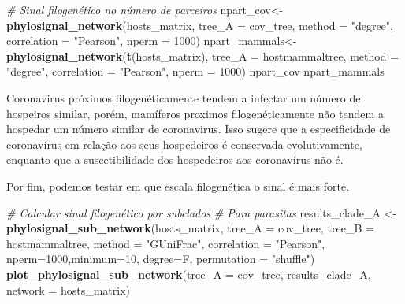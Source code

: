 \documentclass[
]{book}
\newenvironment{Shaded}{\begin{snugshade}}{\end{snugshade}}
\newcommand{\AttributeTok}[1]{\textcolor[rgb]{0.13,0.29,0.53}{#1}}
\newcommand{\CommentTok}[1]{\textcolor[rgb]{0.56,0.35,0.01}{\textit{#1}}}
\newcommand{\DecValTok}[1]{\textcolor[rgb]{0.00,0.00,0.81}{#1}}
\newcommand{\FunctionTok}[1]{\textcolor[rgb]{0.13,0.29,0.53}{\textbf{#1}}}
\newcommand{\NormalTok}[1]{#1}
\newcommand{\OtherTok}[1]{\textcolor[rgb]{0.56,0.35,0.01}{#1}}
\newcommand{\StringTok}[1]{\textcolor[rgb]{0.31,0.60,0.02}{#1}}
\begin{document}
\begin{Shaded}
\begin{Highlighting}[]
\CommentTok{\# Sinal filogenético no número de parceiros}
\NormalTok{npart\_cov}\OtherTok{\textless{}{-}}\FunctionTok{phylosignal\_network}\NormalTok{(hosts\_matrix, }
 \AttributeTok{tree\_A =}\NormalTok{ cov\_tree, }
 \AttributeTok{method =} \StringTok{"degree"}\NormalTok{, }
 \AttributeTok{correlation =} \StringTok{"Pearson"}\NormalTok{, }\AttributeTok{nperm =} \DecValTok{1000}\NormalTok{)}
\NormalTok{npart\_mammals}\OtherTok{\textless{}{-}}\FunctionTok{phylosignal\_network}\NormalTok{(}\FunctionTok{t}\NormalTok{(hosts\_matrix), }
 \AttributeTok{tree\_A =}\NormalTok{ hostmammaltree, }
 \AttributeTok{method =} \StringTok{"degree"}\NormalTok{, }
 \AttributeTok{correlation =} \StringTok{"Pearson"}\NormalTok{, }\AttributeTok{nperm =} \DecValTok{1000}\NormalTok{)}
\NormalTok{npart\_cov}
\NormalTok{npart\_mammals}
\end{Highlighting}
\end{Shaded}

Coronavirus próximos filogenéticamente tendem a infectar um número de hospeiros similar, porém, mamíferos proximos filogenéticamente não tendem a hospedar um número similar de coronavirus. Isso sugere que a especificidade de coronavírus em relação aos seus hospedeiros é conservada evolutivamente, enquanto que a suscetibilidade dos hospedeiros aos coronavírus não é.

Por fim, podemos testar em que escala filogenética o sinal é mais forte.

\begin{Shaded}
\begin{Highlighting}[]
\CommentTok{\# Calcular sinal filogenético por subclados}
\CommentTok{\# Para parasitas}
\NormalTok{results\_clade\_A }\OtherTok{\textless{}{-}} \FunctionTok{phylosignal\_sub\_network}\NormalTok{(hosts\_matrix, }
 \AttributeTok{tree\_A =}\NormalTok{ cov\_tree, }
 \AttributeTok{tree\_B =}\NormalTok{ hostmammaltree, }
 \AttributeTok{method =} \StringTok{"GUniFrac"}\NormalTok{, }
 \AttributeTok{correlation =} \StringTok{"Pearson"}\NormalTok{, }
 \AttributeTok{nperm=}\DecValTok{1000}\NormalTok{,}\AttributeTok{minimum=}\DecValTok{10}\NormalTok{, }\AttributeTok{degree=}\NormalTok{F,}
 \AttributeTok{permutation =} \StringTok{"shuffle"}\NormalTok{)}
\FunctionTok{plot\_phylosignal\_sub\_network}\NormalTok{(}\AttributeTok{tree\_A =}\NormalTok{ cov\_tree, results\_clade\_A,}
 \AttributeTok{network =}\NormalTok{ hosts\_matrix)}
\end{Highlighting}
\end{Shaded}
\end{document}
